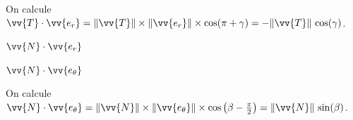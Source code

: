 
\begin{corrige}
	On calcule $\vv{T}\cdot\vv{e_r}
		= \Arrowvert\vv{T}\Arrowvert\times
			\Arrowvert\vv{e_r}\Arrowvert\times
			\cos(\pi + \gamma)
		= -\Arrowvert\vv{T}\Arrowvert\,\cos(\gamma)$.
\end{corrige}





\begin{enonce}
$\vv{N}\cdot\vv{e_r}$
\end{enonce}





\begin{enonce}
$\vv{N}\cdot\vv{e_\theta}$
\end{enonce}


\begin{corrige}
	On calcule $\vv{N}\cdot\vv{e_\theta}
		= \Arrowvert\vv{N}\Arrowvert\times
			\Arrowvert\vv{e_\theta}\Arrowvert\times
			\cos\left(\beta - \frac\pi2\right)
		= \Arrowvert\vv{N}\Arrowvert\,\sin(\beta)$.
\end{corrige}


\finEntrainement







\hauteurLargeurCadreReponse		{10mm}{4.5cm}
\initialisationEntrainement

